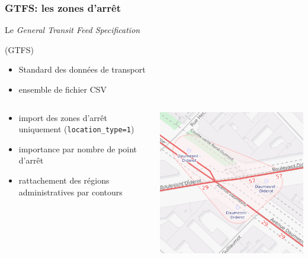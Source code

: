 \documentclass[table]{beamer}
\newcommand*{\foreign}[2][english]{%
    \emph{\foreignlanguage{#1}{#2}}%
}
\begin{document}
\begin{frame}
  \frametitle{GTFS: les zones d'arrêt}

  \begin{block}{Le \foreign{General Transit Feed Specification}
      (GTFS)}
    \begin{itemize}
    \item Standard des données de transport
    \item ensemble de fichier CSV
    \end{itemize}
  \end{block}

  \begin{columns}
    \begin{column}{.65\linewidth}
      \begin{itemize}
      \item import des zones d'arrêt uniquement (\texttt{location\_type=1})
      \item importance par nombre de point d'arrêt
      \item rattachement des régions administratives par contours
      \end{itemize}
    \end{column}
    \begin{column}{.35\linewidth}
      \includegraphics[width=\textwidth]{images/stop-area}
    \end{column}
  \end{columns}

\end{frame}
\end{document}
